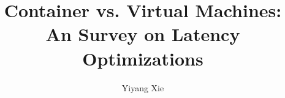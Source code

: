 \usepackage[utf8]{inputenc}
\usepackage{packages}
\usepackage{beamermods}

\author[Yiyang Xie]{Yiyang Xie}
\title[Container vs. Virtual Machines: An Survey on Latency Optimizations]{Container vs. Virtual Machines: An Survey on Latency Optimizations}



\date{}




\usepackage{pgfpages}
\usepackage{ifthen}
\newif\ifsolution%

\makeatletter
\let\@@magyar@captionfix\relax
\makeatother
